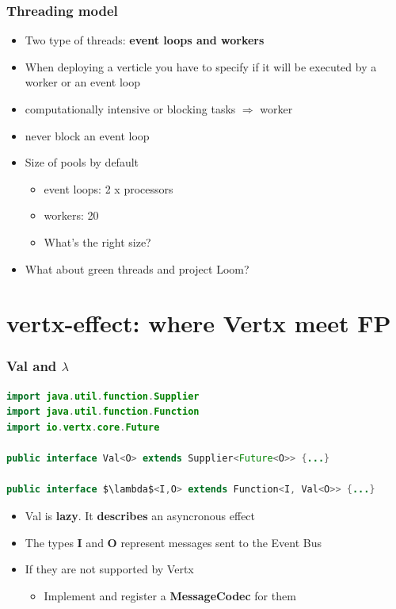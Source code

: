 \documentclass{beamer}
\begin{document}
\begin{frame}
\frametitle{Threading model}
\begin{itemize}
\item<1->Two type of threads: \textbf{event loops and workers}
\item<2-> When deploying a verticle you have to specify if it will be executed by      
 a worker or an event loop
\item<3-> computationally intensive or blocking tasks $\Rightarrow$ worker
 \item<4-> never block an event loop
 \item<5-> Size of pools by default
 \begin{itemize}
          \item<6->event loops: 2 x processors
          \item<7->workers: 20
          \item<8->What's the right size?
 \end{itemize}     
 \item<9-> What about green threads and project Loom?    
\end{itemize}
\end{frame}


 
\section{vertx-effect: where Vertx meet FP }

\begin{frame}[fragile]
\frametitle{Val and $\lambda$ }
\begin{lstlisting}[language=Java,numbers=none,mathescape=true]
import java.util.function.Supplier
import java.util.function.Function
import io.vertx.core.Future

public interface Val<O> extends Supplier<Future<O>> {...}

public interface $\lambda$<I,O> extends Function<I, Val<O>> {...}

\end{lstlisting}

\clearpage

\begin{itemize}
 \item<1->  Val is \textbf{lazy}. It \textbf{describes} an asyncronous effect
 \item<2-> The types \textbf{I} and \textbf{O} represent messages sent to the Event Bus 
 \item<3-> If they are not supported by Vertx
       \begin{itemize}
        \item<4-> Implement and register a \textbf{MessageCodec} for them
      \end{itemize}
 \end{itemize}

\end{frame}
\end{document}
